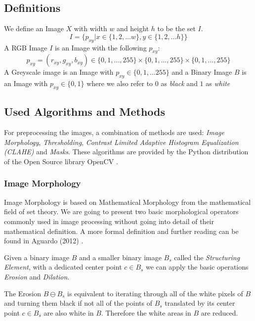 \documentclass[serif,article,noparskip]{agse-thesis}
\begin{document}
\subsection{Definitions} \label{definitions}

We define an Image $X$ with width $w$ and height $h$ to be the set $I$.
$$I = \{p_{xy} | x \in \{1,2, \dots w\}, y \in \{1,2, \dots h\} \}$$
A RGB Image $I$ is an Image with the following  $p_{xy}$: $$p_{xy} = (r_{xy}, g_{xy}, b_{xy}) \in \{0,1,...,255\} \times
\{0,1,...,255\} \times\{0,1,...,255\}$$ A Greyscale image is an Image with
$p_{xy} \in \{0,1, \dots 255\}$ and a Binary Image $B$ is an Image with $p_{xy} \in \{0,1\}$ where we also refer to
$0$ as \textit{black} and $1$ as \textit{white}

\subsection{Used Algorithms and Methods} \label{used}

For preprocessing the images, a combination of methods are used: \textit{Image
Morphology}, \textit{Thresholding}, \textit{Contrast Limited Adaptive Histogram
Equalization (CLAHE)} and \textit{Masks}. These algorithms are provided by the
Python distribution of the Open Source library OpenCV \cite{opencv_library}.

\subsubsection{Image Morphology}

Image Morphology is based on Mathematical Morphology from the mathematical field
of set theory. We are going to present two basic morphological operators
commonly used in image processing without going into detail of their
mathematical definition. A more formal definition and further reading can be
found in Aguardo (2012) \cite{Aguardo2012}.

Given a binary image $B$ and a smaller binary image $B_s$ called the
\textit{Structuring Element}, with a dedicated center point $c \in B_s$ we can
apply the basic operations \textit{Erosion} and \textit{Dilation}.


The Erosion $B \ominus B_s$ is equivalent to iterating through all of the white
pixels of $B$ and turning them black if not all of the points of $B_s$
translated by its center point $c \in B_s$ are also white in $B$. Therefore the
white areas in $B$ are reduced. \cite{Smith1997}
\end{document}
